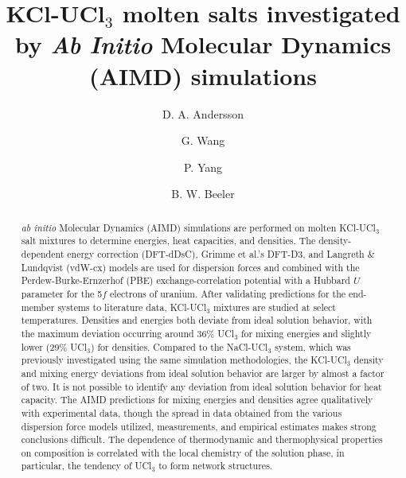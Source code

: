 \documentclass[preprint,3p,10pt,number,sort&compress]{elsarticle}
\begin{document}
\begin{frontmatter}

\title{KCl-UCl$_3$ molten salts investigated by \textit{Ab Initio} Molecular Dynamics (AIMD) simulations}


\author[label1]{D. A. Andersson}
\author[label1]{G. Wang}
\author[label1]{P. Yang}
\author[label2,label3]{B. W. Beeler}

\address[label1]{Materials Science and Technology Division, Los Alamos National Laboratory P.O. Box 1663, Los Alamos, NM 87545, USA}
\address[label2]{Department of Nuclear Engineering, North Carolina State University, Raleigh, NC, United States}
\address[label3]{Idaho National Laboratory, Idaho Falls, ID 83415, United States}


\begin{abstract}

\textit{ab initio} Molecular Dynamics (AIMD) simulations are performed on molten KCl-UCl$_3$ salt mixtures to determine energies, heat capacities, and densities. 
The density-dependent energy correction (DFT-dDsC), Grimme et al.'s DFT-D3, and Langreth \& Lundqvist (vdW-cx) models are used for dispersion forces and combined with the Perdew-Burke-Ernzerhof (PBE) exchange-correlation potential with a Hubbard $U$ parameter for the 5$f$ electrons of uranium. After validating predictions for the end-member systems to literature data, KCl-UCl$_3$ mixtures are studied at select temperatures. Densities and energies both deviate from ideal solution behavior, with the maximum deviation occurring around 36\% UCl$_3$ for mixing energies and slightly lower (29\% UCl$_3$) for densities. Compared to the NaCl-UCl$_3$ system, which was previously investigated using the same simulation methodologies, the KCl-UCl$_3$ density and mixing energy deviations from ideal solution behavior are larger by almost a factor of two. %
It is not possible to identify any deviation from ideal solution behavior for heat capacity. The AIMD predictions for mixing energies and densities agree qualitatively with experimental data, though the spread in data obtained from the various dispersion force models utilized, measurements, and empirical estimates makes strong conclusions difficult. The dependence of thermodynamic and thermophysical properties on composition is correlated with the local chemistry of the solution phase, in particular, the tendency of UCl$_3$ to form network structures.  
\end{abstract}




\end{frontmatter}
\end{document}
